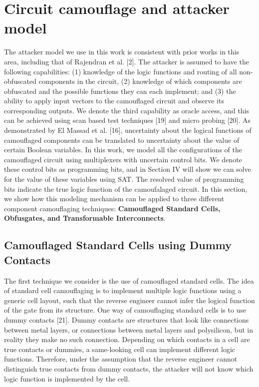 \documentclass[proposal]{umassthesis}  %
\begin{document}
\section{Circuit camouflage and attacker model}
The attacker model we use in this work is consistent with prior works in this area, including that of Rajendran et al. [2]. The attacker is assumed to have the following capabilities: (1) knowledge of the logic functions and routing of all non- obfuscated components in the circuit, (2) knowledge of which components are obfuscated and the possible functions they can each implement; and (3) the ability to apply input vectors to the camouflaged circuit and observe its corresponding outputs. We denote the third capability as oracle access, and this can be achieved using scan based test techniques [19] and micro probing [20]. As demonstrated by El Massad et al. [16], uncertainty about the logical functions of camouflaged components can be translated to uncertainty about the value of certain Boolean variables. In this work, we model all the configurations of the camouflaged circuit using multiplexers with uncertain control bits. We denote these control bits as programming bits, and in Section IV will show we can solve for the value of these variables using SAT. The resolved value of programming bits indicate the true logic function of the camoufalaged circuit. In this section, we show how this modeling mechanism can be applied to three different component camouflaging techniques: \textbf{Camouflaged Standard Cells, Obfusgates, and Transformable Interconnects}.

\subsection{Camouflaged Standard Cells using Dummy Contacts}
The first technique we consider is the use of camouflaged standard cells. The idea of standard cell camouflaging is to implement multiple logic functions using a generic cell layout, such that the reverse engineer cannot infer the logical function of the gate from its structure. One way of camouflaging standard cells is to use dummy contacts [21]. Dummy contacts are structures that look like connections between metal layers, or connections between metal layers and polysilicon, but in reality they make no such connection. Depending on which contacts in a cell are true contacts or dummies, a same-looking cell can implement different logic functions. Therefore, under the assumption that the reverse engineer cannot distinguish true contacts from dummy contacts, the attacker will not know which logic function is implemented by the cell.
\end{document}

